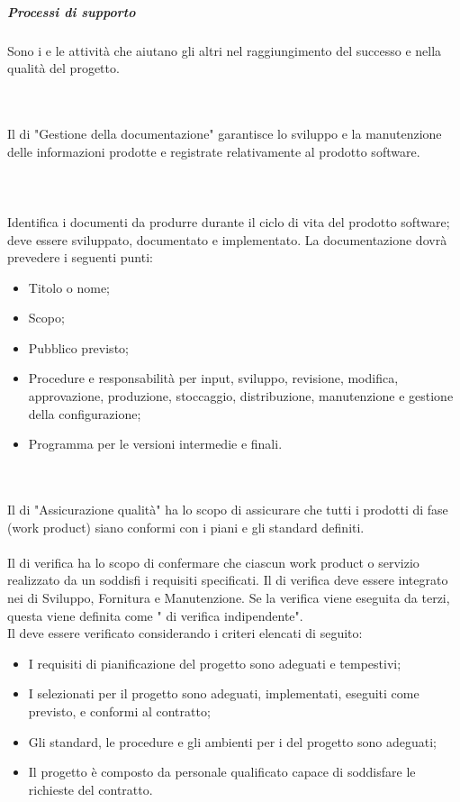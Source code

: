 \subparagraph{Processi di supporto}
Sono i  e le attività che aiutano gli altri  nel raggiungimento del successo e nella qualità del progetto.

\mbox{} \\ \\
Il  di "Gestione della documentazione" garantisce lo sviluppo e la manutenzione delle informazioni prodotte e registrate relativamente al prodotto software. \\ \\
\mbox{} \\ \\
Identifica i documenti da produrre durante il ciclo di vita del prodotto software;
deve essere sviluppato, documentato e implementato. La documentazione dovrà prevedere i seguenti punti: 
\begin{itemize}
    \item Titolo o nome;
    \item Scopo;
    \item Pubblico previsto;
    \item Procedure e responsabilità per input, sviluppo, revisione, modifica, approvazione, produzione, stoccaggio, distribuzione, manutenzione e gestione della configurazione;
    \item Programma per le versioni intermedie e finali.
\end{itemize}

\mbox{} \\ \\
Il  di "Assicurazione qualità" ha lo scopo di assicurare che tutti i prodotti di fase (work product) siano conformi con i piani e gli standard definiti.
\mbox{} \\ \\
Il  di verifica ha lo scopo di confermare che ciascun work product o servizio realizzato da un  soddisfi i requisiti specificati. 
Il  di verifica deve essere integrato nei  di Sviluppo, Fornitura e Manutenzione. Se la verifica viene eseguita da terzi, questa viene definita come " di verifica indipendente".
\\
Il  deve essere verificato considerando i criteri elencati di seguito:
\begin{itemize}
    \item I requisiti di pianificazione del progetto sono adeguati e tempestivi;
    \item I  selezionati per il progetto sono adeguati, implementati, eseguiti come previsto, e conformi al contratto;
    \item Gli standard, le procedure e gli ambienti per i  del progetto sono adeguati;
    \item Il progetto è composto da personale qualificato capace di soddisfare le richieste del contratto.
\end{itemize}

